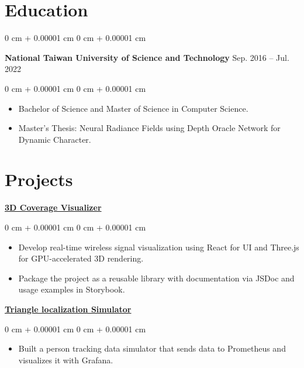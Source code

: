 \documentclass[10pt, letterpaper]{article}
\newenvironment{highlights}{
    \begin{itemize}[
        topsep=0.10 cm,
        parsep=0.10 cm,
        partopsep=0pt,
        itemsep=0pt,
        leftmargin=0 cm + 10pt
    ]
}{
    \end{itemize}
} %
\newenvironment{onecolentry}{
    \begin{adjustwidth}{
        0 cm + 0.00001 cm
    }{
        0 cm + 0.00001 cm
    }
}{
    \end{adjustwidth}
} %
\newenvironment{twocolentry}[2][]{
    \onecolentry
    \def\secondColumn{#2}
    \setcolumnwidth{\fill, 4.5 cm}
    \begin{paracol}{2}
}{
    \switchcolumn \raggedleft \secondColumn
    \end{paracol}
    \endonecolentry
} %
\begin{document}
    
    
    \section{Education}
    
     \begin{twocolentry}{
        Sep. 2016 – Jul. 2022
    }
        \textbf{National Taiwan University of Science and Technology}\end{twocolentry}
    
    
    \vspace{0.10 cm}
    \begin{onecolentry}
        \begin{highlights}
            \item Bachelor of Science and Master of Science in Computer Science.
            \item Master’s Thesis: Neural Radiance Fields using Depth Oracle Network for Dynamic Character.
        \end{highlights}
    \end{onecolentry}
    
    
    \section{Projects}
        \href{https://github.com/tsengyushiang/coverage-visualizer}{\textbf{3D Coverage Visualizer}}

        \vspace{0.10 cm}
        \begin{onecolentry}
            \begin{highlights}
                \item Develop real-time wireless signal visualization using React for UI and Three.js for GPU-accelerated 3D rendering.
                \item Package the project as a reusable library with documentation via JSDoc and usage examples in Storybook.
            \end{highlights}
        \end{onecolentry}

        \vspace{0.2 cm}

        \href{https://github.com/tsengyushiang/triangle-localization-simulator}{\textbf{Triangle localization Simulator}}
        \vspace{0.10 cm}
        \begin{onecolentry}
            \begin{highlights}
                \item Built a person tracking data simulator that sends data to Prometheus and visualizes it with Grafana.
            \end{highlights}
        \end{onecolentry}
\end{document}
